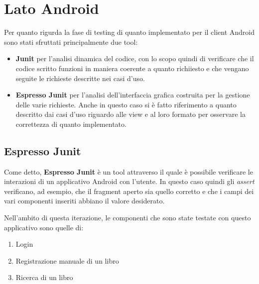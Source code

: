 \section{Lato Android}
Per quanto rigurda la fase di testing di quanto implementato per il client Android sono stati sfruttati principalmente due tool:
\begin{itemize}
	\item \textbf{Junit} per l'analisi dinamica del codice, con lo scopo quindi di verificare che il codice scritto funzioni in maniera coerente a quanto richiiesto e che vengano seguite le richieste descritte nei casi d'uso.
	\item \textbf{Espresso Junit} per l'analisi dell'interfaccia grafica costruita per la gestione delle varie richieste. Anche in questo caso si è fatto riferimento a quanto descritto dai casi d'uso riguardo alle view e al loro formato per osservare la correttezza di quanto implementato. 
\end{itemize}
\subsection{Espresso Junit}
Come detto, \textbf{Espresso Junit} è un tool attraverso il quale è possibile verificare le interazioni di un applicativo Android con l'utente. In questo caso quindi gli \textit{assert} verificano, ad esempio, che il fragment aperto sia quello corretto e che i campi dei vari componenti inseriti abbiano il valore desiderato.

Nell'ambito di questa iterazione, le componenti che sono state testate con questo applicativo sono quelle di:
\begin{enumerate}
	\item Login
	\item Registrazione manuale di un libro
	\item Ricerca di un libro
\end{enumerate}

